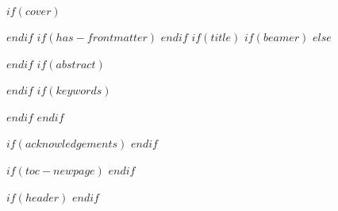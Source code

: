 $if(cover)$

$endif$
$if(has-frontmatter)$
\frontmatter
$endif$
$if(title)$
$if(beamer)$
\frame{\titlepage}
$else$
\maketitle
$endif$
$if(abstract)$
\begin{abstract}
$abstract$
\end{abstract}
$endif$
$if(keywords)$
\begin{center}
\end{center}
$endif$
$endif$

$if(acknowledgements)$
$endif$

$if(toc-newpage)$
\newpage
$endif$

$if(header)$
\thispagestyle{scrheadings}
$endif$